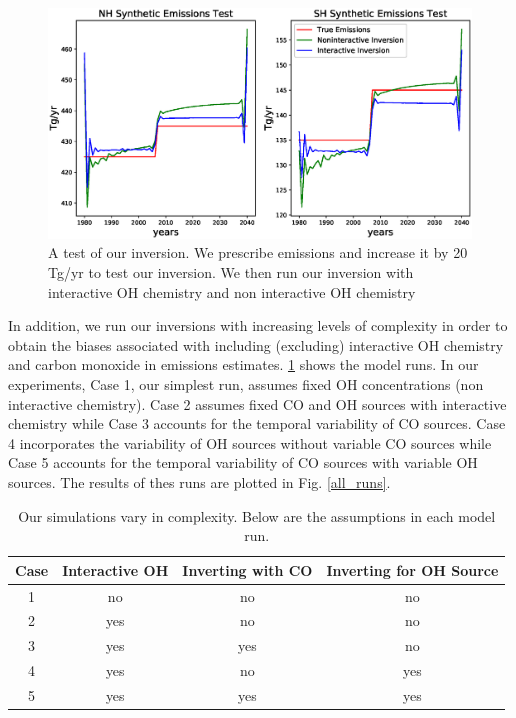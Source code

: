 \documentclass[two column,grl]{AGUTeX}
\begin{document}
\begin{article}
\begin{figure} \label{synthetic_emissions}
\begin{center}
\includegraphics[width=\textwidth]{synthetic_emissions_test.eps}
\end{center}
\caption{A test of our inversion. We prescribe emissions and increase it by 20 Tg/yr to test our inversion. We then run our inversion with interactive OH chemistry and non interactive OH chemistry}
\end{figure}

In addition, we run our inversions with increasing levels of complexity in order to obtain the biases associated with including (excluding) interactive OH chemistry and carbon monoxide in emissions estimates. \ref{model_setup} shows the model runs. In our experiments, Case 1, our simplest run, assumes fixed OH concentrations (non interactive chemistry). Case 2 assumes fixed CO and OH sources with interactive chemistry while Case 3 accounts for the temporal variability of CO sources. Case 4 incorporates the variability of OH sources without variable CO sources while Case 5 accounts for the temporal variability of CO sources with variable OH sources. The results of thes runs are plotted in Fig. \ref{all_runs}.


\begin{table} \label{model_setup}
\caption{Our simulations vary in complexity. Below are the assumptions in each model run.}
\begin{tabular}{| c | c| c| c|}
Case & Interactive OH & Inverting with CO & Inverting for OH Source \\ \hline
1 &  no & no & no  \\
2 & yes & no & no \\
3 & yes & yes & no \\
4 & yes & no & yes \\
5 & yes & yes & yes 
\end{tabular}
\end{table}



\end{article}
\end{document}
